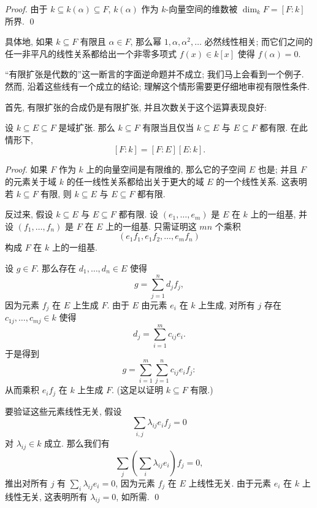 \begin{proof}
由于 $k\subseteq k(\alpha)\subseteq F$, $k(\alpha)$ 作为 $k$-向量空间的维数被 $\dim_k F=[F:k]$ 所界. \qed{}
\end{proof}

具体地, 如果 $k\subseteq F$ 有限且 $\alpha\in F$, 那么幂 $1,\alpha,\alpha^2,\ldots$ 必然线性相关; 而它们之间的任一非平凡的线性关系都给出一个非零多项式 $f(x)\in k[x]$ 使得 $f(\alpha)=0$.

``有限扩张是代数的''这一断言的字面逆命题并不成立; 我们马上会看到一个例子. 然而, 沿着这些线有一个成立的结论; 理解这个情形需要更仔细地审视有限性条件.

首先, 有限扩张的合成仍是有限扩张, 并且次数关于这个运算表现良好:

\begin{proposition}\label{prop:tower-degree}
设 $k\subseteq E\subseteq F$ 是域扩张. 那么 $k\subseteq F$ 有限当且仅当 $k\subseteq E$ 与 $E\subseteq F$ 都有限. 在此情形下,
\[
[F:k]=[F:E][E:k].
\]
\end{proposition}

\begin{proof}
如果 $F$ 作为 $k$ 上的向量空间是有限维的, 那么它的子空间 $E$ 也是; 并且 $F$ 的元素关于域 $k$ 的任一线性关系都给出关于更大的域 $E$ 的一个线性关系. 这表明若 $k\subseteq F$ 有限, 则 $k\subseteq E$ 与 $E\subseteq F$ 都有限.

反过来, 假设 $k\subseteq E$ 与 $E\subseteq F$ 都有限. 设 $(e_1,\ldots,e_m)$ 是 $E$ 在 $k$ 上的一组基, 并设 $(f_1,\ldots,f_n)$ 是 $F$ 在 $E$ 上的一组基. 只需证明这 $mn$ 个乘积
\[
(e_1f_1,e_1f_2,\ldots,e_mf_n)
\]
构成 $F$ 在 $k$ 上的一组基.

设 $g\in F$. 那么存在 $d_1,\ldots,d_n\in E$ 使得
\[
g=\sum_{j=1}^n d_j f_j,
\]
因为元素 $f_j$ 在 $E$ 上生成 $F$. 由于 $E$ 由元素 $e_i$ 在 $k$ 上生成, 对所有 $j$ 存在 $c_{1j},\ldots,c_{mj}\in k$ 使得
\[
d_j=\sum_{i=1}^m c_{ij}e_i.
\]
于是得到
\[
g=\sum_{i=1}^m\sum_{j=1}^n c_{ij}e_i f_j:
\]
从而乘积 $e_if_j$ 在 $k$ 上生成 $F$. (这足以证明 $k\subseteq F$ 有限.)

要验证这些元素线性无关, 假设
\[
\sum_{i,j}\lambda_{ij}e_i f_j=0
\]
对 $\lambda_{ij}\in k$ 成立. 那么我们有
\[
\sum_j\left(\sum_i\lambda_{ij}e_i\right)f_j=0,
\]
推出对所有 $j$ 有 $\sum_i\lambda_{ij}e_i=0$, 因为元素 $f_j$ 在 $E$ 上线性无关. 由于元素 $e_i$ 在 $k$ 上线性无关, 这表明所有 $\lambda_{ij}=0$, 如所需. \qed
\end{proof}


